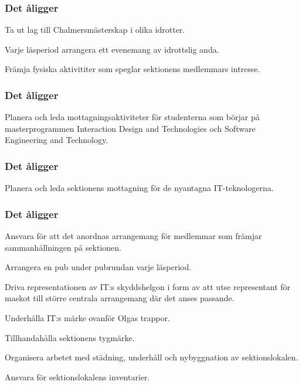 \subsubsection{Det åligger \FRITID}
\begin{att}
	\item Ta ut lag till Chalmersmästerskap i olika idrotter.
	\item Varje läsperiod arrangera ett evenemang av idrottslig anda.
	\item Främja fysiska aktivititer som speglar sektionens medlemmars intresse.
\end{att}

\subsubsection{Det åligger \MRCIT}
\begin{att}
  \item Planera och leda mottagningsaktiviteter för studenterna som börjar på masterprogrammen Interaction Design and Technologies och Software Engineering and Technology.
\end{att}

\subsubsection{Det åligger \NOLLKIT}
\begin{att}
	\item Planera och leda sektionens mottagning för de nyantagna IT-teknologerna.
\end{att}

\subsubsection{Det åligger \PRIT}
\begin{att}
	\item Ansvara för att det anordnas arrangemang för medlemmar som främjar sammanhållningen på sektionen.
	\item Arrangera en pub under pubrundan varje läsperiod.
	\item Driva representationen av IT:s skyddshelgon i form av att utse representant för maskot till större centrala arrangemang där det anses passande.
	\item Underhålla IT:s märke ovanför Olgas trappor.
	\item Tillhandahålla sektionens tygmärke.
	\item Organisera arbetet med städning, underhåll och nybyggnation av sektionslokalen.
	\item Ansvara för sektionslokalens inventarier.
\end{att}

